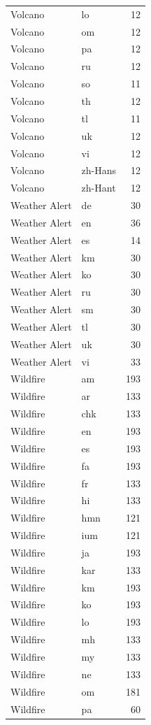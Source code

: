 \begin{longtable}{p{3cm} p{3cm} r}
Volcano & lo & 12 \\
Volcano & om & 12 \\
Volcano & pa & 12 \\
Volcano & ru & 12 \\
Volcano & so & 11 \\
Volcano & th & 12 \\
Volcano & tl & 11 \\
Volcano & uk & 12 \\
Volcano & vi & 12 \\
Volcano & zh-Hans & 12 \\
Volcano & zh-Hant & 12 \\
Weather Alert & de & 30 \\
Weather Alert & en & 36 \\
Weather Alert & es & 14 \\
Weather Alert & km & 30 \\
Weather Alert & ko & 30 \\
Weather Alert & ru & 30 \\
Weather Alert & sm & 30 \\
Weather Alert & tl & 30 \\
Weather Alert & uk & 30 \\
Weather Alert & vi & 33 \\
Wildfire & am & 193 \\
Wildfire & ar & 133 \\
Wildfire & chk & 133 \\
Wildfire & en & 193 \\
Wildfire & es & 193 \\
Wildfire & fa & 193 \\
Wildfire & fr & 133 \\
Wildfire & hi & 133 \\
Wildfire & hmn & 121 \\
Wildfire & ium & 121 \\
Wildfire & ja & 193 \\
Wildfire & kar & 133 \\
Wildfire & km & 193 \\
Wildfire & ko & 193 \\
Wildfire & lo & 193 \\
Wildfire & mh & 133 \\
Wildfire & my & 133 \\
Wildfire & ne & 133 \\
Wildfire & om & 181 \\
Wildfire & pa & 60 \\

\end{longtable}
